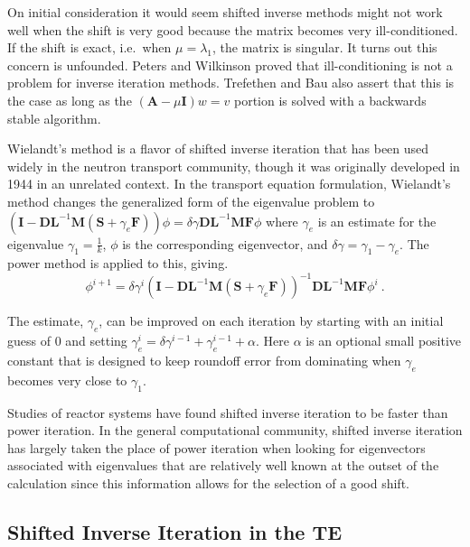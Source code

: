 \documentclass[12pt]{article}
\newcommand{\ve}[1]{\ensuremath{\mathbf{#1}}}
\begin{document}
On initial consideration it would seem shifted inverse methods might not work well when the shift is very good because the matrix becomes very ill-conditioned. If the shift is exact, i.e.\ when $\mu = \lambda_{1}$, the matrix is singular. It turns out this concern is unfounded. Peters and Wilkinson proved that ill-conditioning is not a problem for inverse iteration methods. %
Trefethen and Bau also assert that this is the case as long as the $(\ve{A}-\mu \ve{I})w = v$ portion is solved with a backwards stable algorithm.%

Wielandt's method is a flavor of shifted inverse iteration that has been used widely in the neutron transport community, though it was originally developed in 1944 in an unrelated context. %
In the transport equation formulation, Wielandt's method changes the generalized form of the eigenvalue problem to $(\ve{I} - \ve{DL}^{-1}\ve{M}(\ve{S} +\gamma_e \ve{F}))\phi = \delta \gamma \ve{DL}^{-1}\ve{MF} \phi$ where $\gamma_e$ is an estimate for the eigenvalue $\gamma_1 = \frac{1}{k}$, $\phi$ is the corresponding eigenvector, and $\delta \gamma = \gamma_1 - \gamma_e$. The power method is applied to this, giving.%
%
\begin{equation}
\phi^{i+1} = \delta \gamma^{i}(\ve{I} - \ve{DL}^{-1}\ve{M}(\ve{S} + \gamma_e \ve{F}))^{-1}\ve{DL}^{-1}\ve{MF}\phi^{i} \:. \label{eq:Wielandt}
\end{equation}

The estimate, $\gamma_e$, can be improved on each iteration by starting with an initial guess of $0$ and setting $\gamma_e^i = \delta \gamma^{i-1} + \gamma_e^{i-1} + \alpha$. Here $\alpha$ is an optional small positive constant that is designed to keep roundoff error from dominating when $\gamma_e$ becomes very close to $\gamma_1$.%

Studies of reactor systems have found shifted inverse iteration to be faster than power iteration. %
In the general computational community, shifted inverse iteration has largely taken the place of power iteration when looking for eigenvectors associated with eigenvalues that are relatively well known at the outset of the calculation since this information allows for the selection of a good shift.%

\subsection*{Shifted Inverse Iteration in the TE}
\end{document}
